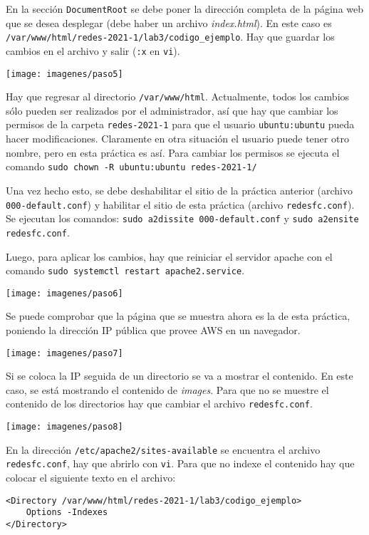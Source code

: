 \documentclass{article}
\begin{document}
En la sección \texttt{DocumentRoot} se debe poner la dirección completa de la página web que se desea desplegar (debe haber un archivo \textit{index.html}). En este caso es \texttt{/var/www/html/redes-2021-1/lab3/codigo\_ejemplo}. Hay que guardar los cambios en el archivo y salir (\texttt{:x} en \texttt{vi}).

\texttt{[image: imagenes/paso5]}

Hay que regresar al directorio \texttt{/var/www/html}. Actualmente, todos los cambios sólo pueden ser realizados por el administrador, así que hay que cambiar los permisos de la carpeta \texttt{redes-2021-1} para que el usuario \texttt{ubuntu:ubuntu} pueda hacer modificaciones. Claramente en otra situación el usuario puede tener otro nombre, pero en esta práctica es así. Para cambiar los permisos se ejecuta el comando \texttt{sudo chown -R ubuntu:ubuntu redes-2021-1/}

Una vez hecho esto, se debe deshabilitar el sitio de la práctica anterior (archivo \texttt{000-default.conf}) y habilitar el sitio de esta práctica (archivo \texttt{redesfc.conf}). Se ejecutan los comandos: \texttt{sudo a2dissite 000-default.conf} y \texttt{sudo a2ensite redesfc.conf}.

Luego, para aplicar los cambios, hay que reiniciar el servidor apache con el comando \texttt{sudo systemctl restart apache2.service}.

\texttt{[image: imagenes/paso6]}

Se puede comprobar que la página que se muestra ahora es la de esta práctica, poniendo la dirección IP pública que provee AWS en un navegador.

\texttt{[image: imagenes/paso7]}

Si se coloca la IP seguida de un directorio se va a mostrar el contenido. En este caso, se está mostrando el contenido de \textit{images}. Para que no se muestre el contenido de los directorios hay que cambiar el archivo \texttt{redesfc.conf}.

\texttt{[image: imagenes/paso8]}

En la dirección \texttt{/etc/apache2/sites-available} se encuentra el archivo \texttt{redesfc.conf}, hay que abrirlo con \texttt{vi}. Para que no indexe el contenido hay que colocar el siguiente texto en el archivo:

\begin{verbatim}
<Directory /var/www/html/redes-2021-1/lab3/codigo_ejemplo>
    Options -Indexes
</Directory>
\end{verbatim}
\end{document}
